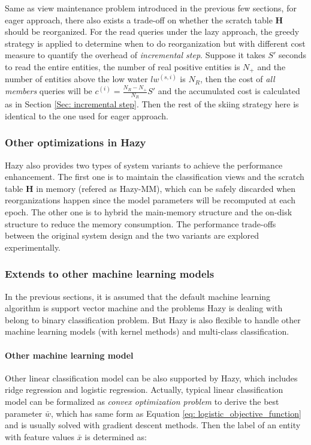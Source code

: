Same as view maintenance problem introduced in the previous few sections, for eager approach, there also exists a trade-off on whether the scratch table $\textbf{H}$ should be reorganized. For the read queries under the lazy approach, the greedy strategy is applied to determine when to do reorganization but with different cost measure to quantify the overhead of {\em incremental step}. Suppose it takes $S'$ seconds to read the entire entities, the number of real positive entities is $N_{+}$ and the number of entities above the low water $lw^{(s,i)}$ is $N_{R}$, then the cost of {\em all members} queries will be $c^{(i)} = \frac{N_{R}-N_{+}}{N_{R}}S'$ and the accumulated cost is calculated as in Section \ref{Sec: incremental step}. Then the rest of the skiing strategy here is identical to the one used for eager approach.


\subsubsection{Other optimizations in Hazy}
Hazy also provides two types of system variants to achieve the performance enhancement. The first one is to maintain the classification views and the scratch table $\textbf{H}$ in memory (refered as Hazy-MM), which can be safely discarded when reorganizations happen since the model parameters will be recomputed at each epoch. The other one is to hybrid the main-memory structure and the on-disk structure to reduce the memory consumption. The performance trade-offs between the original system design and the two variants are explored experimentally.

\subsubsection{Extends to other machine learning models}
In the previous sections, it is assumed that the default machine learning algorithm is support vector machine and the problems Hazy is dealing with belong to binary classification problem. But Hazy is also flexible to handle other machine learning models (with kernel methods) and multi-class classification.

\paragraph{Other machine learning model}
Other linear classification model can be also supported by Hazy, which includes ridge regression and logistic regression. Actually, typical linear classification model can be formalized as {\em convex optimization problem} to derive the best parameter $\bar{w}$, which has same form as Equation \ref{eq: logistic_objective_function} and is usually solved with gradient descent methods. Then the label of an entity with feature values $\bar{x}$ is determined as:

